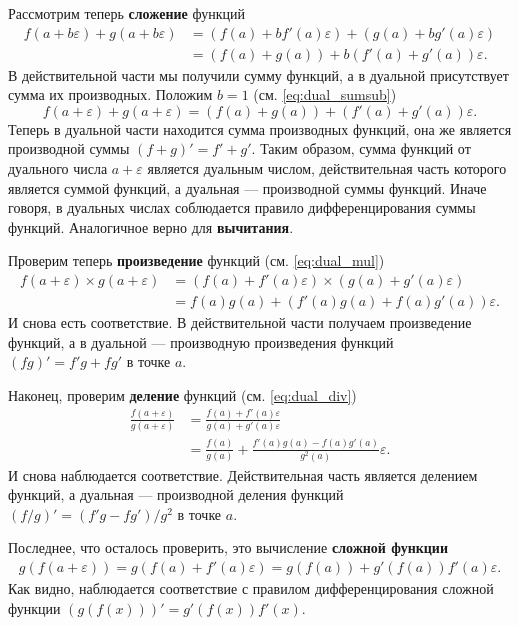 \documentclass{article}
\newcommand{\dual}{\varepsilon}
\theoremstyle{definition}
\begin{document}
Рассмотрим теперь \textbf{сложение} функций
\begin{align*}
  f(a + b \dual) + g(a + b \dual) &= (f(a) + b f'(a) \dual) + (g(a) + b g'(a) \dual)
  \\
  &= (f(a) + g(a)) + b (f'(a) + g'(a)) \dual
.\end{align*}
В действительной части мы получили сумму функций, а в дуальной присутствует сумма их производных. Положим $b = 1$ (см. \eqref{eq:dual_sumsub})
\[
  f(a + \dual) + g(a + \dual) = (f(a) + g(a)) + (f'(a) + g'(a)) \dual
.\]
Теперь в дуальной части находится сумма производных функций, она же является производной суммы $(f + g)' = f' + g'$. Таким образом, сумма функций от дуального числа $a + \dual$ является дуальным числом, действительная часть которого является суммой функций, а дуальная --- производной суммы функций. Иначе говоря, в дуальных числах соблюдается правило дифференцирования суммы функций. Аналогичное верно для \textbf{вычитания}.

Проверим теперь \textbf{произведение} функций (см. \eqref{eq:dual_mul})
\begin{align*}
  f(a + \dual) \times g(a + \dual) &= (f(a) + f'(a) \dual) \times (g(a) + g'(a) \dual)
  \\
  &= f(a) g(a) + (f'(a) g(a) + f(a) g'(a)) \dual
.\end{align*}
И снова есть соответствие. В действительной части получаем произведение функций, а в дуальной --- производную произведения функций $(fg)' = f'g + fg'$ в точке $a$.

Наконец, проверим \textbf{деление} функций (см. \eqref{eq:dual_div})
\begin{align*}
  \frac{f(a + \dual)}{g(a + \dual)} &= \frac{f(a) + f'(a) \dual}{g(a) + g'(a) \dual}
  \\
  &= \frac{f(a)}{g(a)} + \frac{f'(a) g(a) - f(a) g'(a)}{g^2(a)} \dual
.\end{align*}
И снова наблюдается соответствие. Действительная часть является делением функций, а дуальная --- производной деления функций $(f/g)' = (f'g - f g')/g^2$ в точке $a$.

Последнее, что осталось проверить, это вычисление \textbf{сложной функции}
\begin{align*}
  g(f(a + \dual)) = g(f(a) + f'(a)\dual) = g(f(a)) + g'(f(a)) f'(a)\dual
.\end{align*}
Как видно, наблюдается соответствие с правилом дифференцирования сложной функции $(g(f(x)))' = g'(f(x)) f'(x)$.
\end{document}
